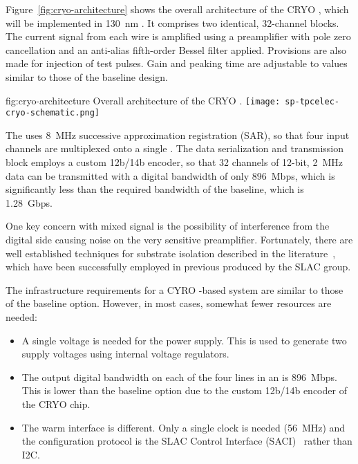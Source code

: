 Figure~\ref{fig:cryo-architecture} shows the overall architecture of the CRYO , which will be implemented in \SI{130}{nm} .
It comprises two identical, \num{32}-channel blocks. 
The current signal from each wire is amplified using a preamplifier with pole zero cancellation and an anti-alias fifth-order Bessel filter applied. 
Provisions are also made for injection of test pulses. 
Gain and peaking time are adjustable to values similar to those of the baseline design.

\begin{dunefigure}
{fig:cryo-architecture}
{Overall architecture of the CRYO .}
\texttt{[image: sp-tpcelec-cryo-schematic.png]}
\end{dunefigure}

The  uses \SI{8}{MHz} successive approximation registration (SAR), so that four input channels are multiplexed onto a single . The data serialization and transmission block employs a custom 12b/14b encoder, so that \num{32} channels of \num{12}-bit, \SI{2}{MHz} data can be transmitted with a digital bandwidth of only \SI{896}{Mbps}, which is significantly less than the required bandwidth of the baseline, which is \SI{1.28}{Gbps}.

One key concern with mixed signal  is the possibility of interference from the digital side causing noise on the very sensitive preamplifier. 
Fortunately, there are well established techniques for substrate isolation described in the literature~\cite{yeh}, which have been successfully employed in previous  produced by the SLAC group.%


The infrastructure requirements for a CYRO -based system are similar to those of the baseline option. However, in most cases, somewhat fewer resources are needed:
\begin{itemize}
\item{A single voltage is needed for the power supply. This is used to generate two supply voltages using internal voltage regulators.}
\item{The output digital bandwidth on each of the four lines in an  is \SI{896}{Mbps}. This is lower than the baseline option due to the custom 12b/14b encoder of the CRYO chip. }
\item{The warm interface is different. Only a single clock is needed (\SI{56}{MHz}) and the configuration protocol is the SLAC  Control Interface (SACI)~\cite{SACI} rather than I2C.}
\end{itemize}


